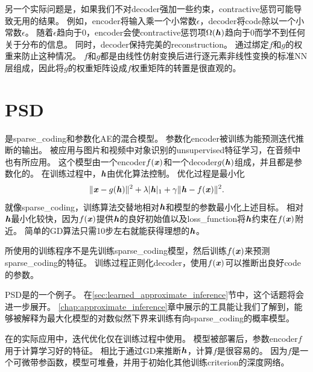另一个实际问题是，如果我们不对\gls{decoder}强加一些约束，\gls{contractive}惩罚可能导致无用的结果。
例如，\gls{encoder}将输入乘一个小常数$\epsilon$，\gls{decoder}将\gls{code}除以一个小常数$\epsilon$。
随着$\epsilon$趋向于0，\gls{encoder}会使\gls{contractive}惩罚项$\Omega(\boldsymbol{\mathit{h}})$趋向于0而学不到任何关于分布的信息。
同时，\gls{decoder}保持完美的\gls{reconstruction}。
\citet{Rifai+al-2011-small}通过绑定$f$和$g$的权重来防止这种情况。
$f$和$g$都是由线性仿射变换后进行逐元素非线性变换的标准\gls{NN}层组成，因此将$g$的权重矩阵设成$f$权重矩阵的转置是很直观的。


\section{\gls{PSD}}
\label{sec:predictive_sparse_decomposition}

是\gls{sparse_coding}和参数化\gls{AE}\citep{koray-psd-08}的混合模型。
参数化\gls{encoder}被训练为能预测迭代推断的输出。
被应用与图片和视频中对象识别的\gls{unsupervised}特征学习\citep{Koray-08-small,koray-nips-10-small,Jarrett-ICCV2009-small,farabet-suml-11}，在音频中也有所应用\citep{henaff-ismir-11-small}。
这个模型由一个\gls{encoder}$f(\boldsymbol{\mathit{x}})$和一个\gls{decoder}$g(\boldsymbol{\mathit{h}})$组成，并且都是参数化的。
在训练过程中，$\boldsymbol{\mathit{h}}$由优化算法控制。
优化过程是最小化
\begin{align}
 \| \boldsymbol{\mathit{x}} - g(\boldsymbol{\mathit{h}}) \| ^2 + \lambda | \boldsymbol{\mathit{h}} |_1 + \gamma \| \boldsymbol{\mathit{h}} - f(\boldsymbol{\mathit{x}}) \|^2.
\end{align}
就像\gls{sparse_coding}，训练算法交替地相对$\boldsymbol{\mathit{h}}$和模型的参数最小化上述目标。
相对$\boldsymbol{\mathit{h}}$最小化较快，因为$f(\boldsymbol{\mathit{x}})$提供$\boldsymbol{\mathit{h}}$的良好初始值以及\gls{loss_function}将$\boldsymbol{\mathit{h}}$约束在$f(\boldsymbol{\mathit{x}})$附近。
简单的\gls{GD}算法只需10步左右就能获得理想的$\boldsymbol{\mathit{h}}$。


所使用的训练程序不是先训练\gls{sparse_coding}模型，然后训练$f(\boldsymbol{\mathit{x}})$来预测\gls{sparse_coding}的特征。
训练过程正则化\gls{decoder}，使用$f(\boldsymbol{\mathit{x}})$可以推断出良好\gls{code}的参数。


\gls{PSD}是的一个例子。
在\ref{sec:learned_approximate_inference}节中，这个话题将会进一步展开。
\ref{chap:approximate_inference}章中展示的工具能让我们了解到，能够被解释为最大化模型的对数似然下界来训练有向\gls{sparse_coding}的概率模型。


在的实际应用中，迭代优化仅在训练过程中使用。
模型被部署后，参数\gls{encoder}$f$用于计算学习好的特征。
相比于通过\gls{GD}来推断$\boldsymbol{\mathit{h}}$，计算$f$是很容易的。
因为$f$是一个可微带参函数，模型可堆叠，并用于初始化其他训练\gls{criterion}的深度网络。

